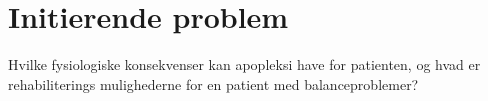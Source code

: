 \section{Initierende problem}
Hvilke fysiologiske konsekvenser kan apopleksi have for patienten, og hvad er rehabiliterings mulighederne for en patient med balanceproblemer? 